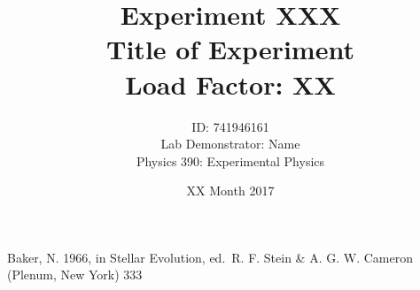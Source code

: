 \documentclass[10pt]{article}
\title{Experiment XXX\\
Title of Experiment\\
{\large Load Factor: XX}\\
\vspace{5cm}}
\author{ID: 741946161\\
Lab Demonstrator: Name\\
Physics 390: Experimental Physics\\
\vspace{1cm}}
\date{XX Month 2017}
\begin{document}
\maketitle

\newpage

\begin{thebibliography}{}
	
	 Baker, N. 1966,
	in Stellar Evolution,
	ed.\ R. F. Stein \& A. G. W. Cameron
	(Plenum, New York) 333
	
\end{thebibliography}
\end{document}
